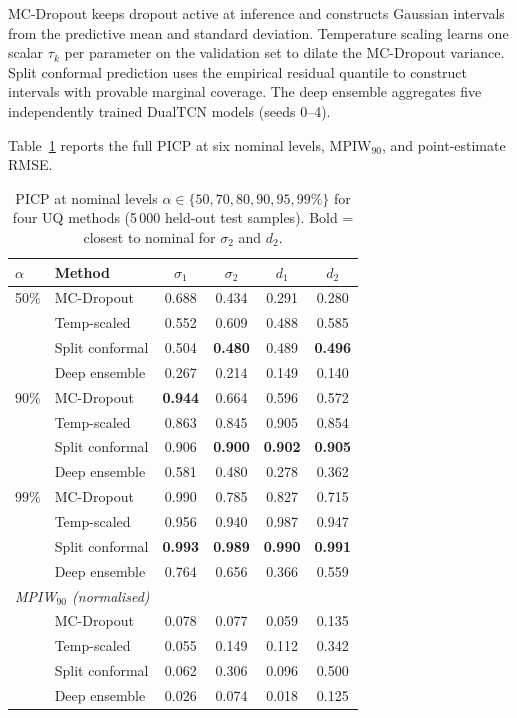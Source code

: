 \documentclass[journal]{IEEEtran}
\begin{document}
MC-Dropout keeps dropout active at inference and constructs Gaussian
intervals from the predictive mean and standard deviation.
Temperature scaling learns one scalar $\tau_k$ per parameter on the
validation set to dilate the MC-Dropout variance.  Split conformal
prediction uses the empirical residual quantile to construct intervals
with provable marginal coverage.  The deep ensemble aggregates five
independently trained DualTCN models (seeds 0--4).

Table~\ref{tab:supp_uq} reports the full PICP at six nominal levels,
MPIW$_{90}$, and point-estimate RMSE.

\begin{table}[t]
  \centering
  \footnotesize
  \caption{PICP at nominal levels $\alpha \in \{50, 70, 80, 90, 95,
  99\%\}$ for four UQ methods (5\,000 held-out test samples).
  Bold = closest to nominal for $\sigma_2$ and $d_2$.}
  \label{tab:supp_uq}
  \scriptsize
  \setlength{\tabcolsep}{2pt}
  \begin{tabular}{llcccc}
    \toprule
    $\alpha$ & Method & $\sigma_1$ & $\sigma_2$ & $d_1$ & $d_2$ \\
    \midrule
    50\% & MC-Dropout      & 0.688 & 0.434 & 0.291 & 0.280 \\
         & Temp-scaled     & 0.552 & 0.609 & 0.488 & 0.585 \\
         & Split conformal & 0.504 & \textbf{0.480} & 0.489 & \textbf{0.496} \\
         & Deep ensemble   & 0.267 & 0.214 & 0.149 & 0.140 \\
    \midrule
    90\% & MC-Dropout      & \textbf{0.944} & 0.664 & 0.596 & 0.572 \\
         & Temp-scaled     & 0.863 & 0.845 & 0.905 & 0.854 \\
         & Split conformal & 0.906 & \textbf{0.900} & \textbf{0.902} & \textbf{0.905} \\
         & Deep ensemble   & 0.581 & 0.480 & 0.278 & 0.362 \\
    \midrule
    99\% & MC-Dropout      & 0.990 & 0.785 & 0.827 & 0.715 \\
         & Temp-scaled     & 0.956 & 0.940 & 0.987 & 0.947 \\
         & Split conformal & \textbf{0.993} & \textbf{0.989} & \textbf{0.990} & \textbf{0.991} \\
         & Deep ensemble   & 0.764 & 0.656 & 0.366 & 0.559 \\
    \midrule
    \multicolumn{6}{l}{\textit{MPIW$_{90}$ (normalised)}} \\
    & MC-Dropout      & 0.078 & 0.077 & 0.059 & 0.135 \\
    & Temp-scaled     & 0.055 & 0.149 & 0.112 & 0.342 \\
    & Split conformal & 0.062 & 0.306 & 0.096 & 0.500 \\
    & Deep ensemble   & 0.026 & 0.074 & 0.018 & 0.125 \\
    \bottomrule
  \end{tabular}
\end{table}
\end{document}
